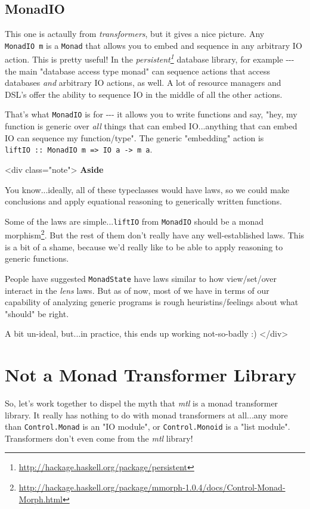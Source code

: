 \documentclass[]{article}
\renewcommand{\href}[2]{#2\footnote{\url{#1}}}
\begin{document}
\subsection{MonadIO}

This one is actaully from \emph{transformers}, but it gives a nice picture. Any
\texttt{MonadIO\ m} is a \texttt{Monad} that allows you to embed and sequence in
any arbitrary IO action. This is pretty useful! In the
\emph{\href{http://hackage.haskell.org/package/persistent}{persistent}} database
library, for example -\/-\/- the main "database access type monad" can sequence
actions that access databases \emph{and} arbitrary IO actions, as well. A lot of
resource managers and DSL's offer the ability to sequence IO in the middle of
all the other actions.

That's what \texttt{MonadIO} is for -\/-\/- it allows you to write functions and
say, "hey, my function is generic over \emph{all} things that can embed
IO...anything that can embed IO can sequence my function/type". The generic
"embedding" action is
\texttt{liftIO\ ::\ MonadIO\ m\ =\textgreater{}\ IO\ a\ -\textgreater{}\ m\ a}.

\textless{}div class="note"\textgreater{} \textbf{Aside}

You know...ideally, all of these typeclasses would have laws, so we could make
conclusions and apply equational reasoning to generically written functions.

Some of the laws are simple...\texttt{liftIO} from \texttt{MonadIO} should be a
\href{http://hackage.haskell.org/package/mmorph-1.0.4/docs/Control-Monad-Morph.html}{monad
morphism}. But the rest of them don't really have any well-established laws.
This is a bit of a shame, because we'd really like to be able to apply reasoning
to generic functions.

People have suggested \texttt{MonadState} have laws similar to how view/set/over
interact in the \emph{lens} laws. But as of now, most of we have in terms of our
capability of analyzing generic programs is rough heuristins/feelings about what
"should" be right.

A bit un-ideal, but...in practice, this ends up working not-so-badly :)
\textless{}/div\textgreater{}

\section{Not a Monad Transformer Library}

So, let's work together to dispel the myth that \emph{mtl} is a monad
transformer library. It really has nothing to do with monad transformers at
all...any more than \texttt{Control.Monad} is an "IO module", or
\texttt{Control.Monoid} is a "list module". Transformers don't even come from
the \emph{mtl} library!
\end{document}
